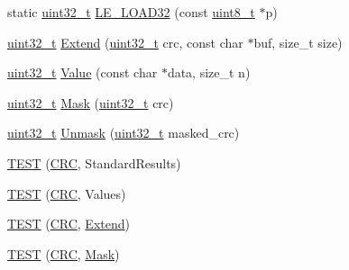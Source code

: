 \begin{DoxyCompactItemize}
\item 
static \hyperlink{stdint_8h_a435d1572bf3f880d55459d9805097f62}{uint32\-\_\-t} \hyperlink{namespaceleveldb_1_1crc32c_a45e9ab8064b6960bef8f04eaa34fc957}{L\-E\-\_\-\-L\-O\-A\-D32} (const \hyperlink{stdint_8h_aba7bc1797add20fe3efdf37ced1182c5}{uint8\-\_\-t} $\ast$p)
\item 
\hyperlink{stdint_8h_a435d1572bf3f880d55459d9805097f62}{uint32\-\_\-t} \hyperlink{namespaceleveldb_1_1crc32c_ac42fd0618afe635356d722fd29f5ff10}{Extend} (\hyperlink{stdint_8h_a435d1572bf3f880d55459d9805097f62}{uint32\-\_\-t} crc, const char $\ast$buf, size\-\_\-t size)
\item 
\hyperlink{stdint_8h_a435d1572bf3f880d55459d9805097f62}{uint32\-\_\-t} \hyperlink{namespaceleveldb_1_1crc32c_ac004d1e3d8c75b033c162e5ae0a5cc2c}{Value} (const char $\ast$data, size\-\_\-t n)
\item 
\hyperlink{stdint_8h_a435d1572bf3f880d55459d9805097f62}{uint32\-\_\-t} \hyperlink{namespaceleveldb_1_1crc32c_a3790e1e939714a29609e46383aafd6cf}{Mask} (\hyperlink{stdint_8h_a435d1572bf3f880d55459d9805097f62}{uint32\-\_\-t} crc)
\item 
\hyperlink{stdint_8h_a435d1572bf3f880d55459d9805097f62}{uint32\-\_\-t} \hyperlink{namespaceleveldb_1_1crc32c_aef7889069ea26dd145509fff4c4e6b66}{Unmask} (\hyperlink{stdint_8h_a435d1572bf3f880d55459d9805097f62}{uint32\-\_\-t} masked\-\_\-crc)
\item 
\hyperlink{namespaceleveldb_1_1crc32c_a2ef79d6b85c2866295c1573ea6e62a52}{T\-E\-S\-T} (\hyperlink{classleveldb_1_1crc32c_1_1_c_r_c}{C\-R\-C}, Standard\-Results)
\item 
\hyperlink{namespaceleveldb_1_1crc32c_aeca842cf29e5136e1594dd5e0a714d7f}{T\-E\-S\-T} (\hyperlink{classleveldb_1_1crc32c_1_1_c_r_c}{C\-R\-C}, Values)
\item 
\hyperlink{namespaceleveldb_1_1crc32c_aec2f6fd8802f5c6473281a2400301fa4}{T\-E\-S\-T} (\hyperlink{classleveldb_1_1crc32c_1_1_c_r_c}{C\-R\-C}, \hyperlink{namespaceleveldb_1_1crc32c_ac42fd0618afe635356d722fd29f5ff10}{Extend})
\item 
\hyperlink{namespaceleveldb_1_1crc32c_aeae3dd6a190a86fb295e1232715e2b23}{T\-E\-S\-T} (\hyperlink{classleveldb_1_1crc32c_1_1_c_r_c}{C\-R\-C}, \hyperlink{namespaceleveldb_1_1crc32c_a3790e1e939714a29609e46383aafd6cf}{Mask})
\end{DoxyCompactItemize}
